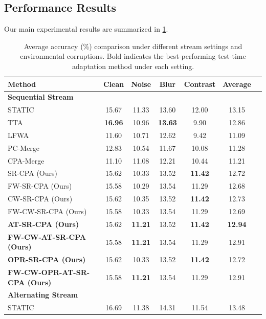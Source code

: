 \documentclass{article}
\theoremstyle{plain}
\theoremstyle{definition}
\theoremstyle{remark}
\begin{document}
\subsection{Performance Results}
\label{subsec:results}

Our main experimental results are summarized in \cref{tab:results}.

\begin{table}[t]
\caption{Average accuracy (\%) comparison under different stream settings and environmental corruptions. Bold indicates the best-performing test-time adaptation method under each setting.}
\label{tab:results}
\begin{center}
\begin{small}
\begin{sc}
\begin{tabular}{lccccc|c}
\toprule
Method & Clean & Noise & Blur & Contrast & Average \\
\midrule
\textbf{Sequential Stream} & & & & & \\
STATIC & 15.67 & 11.33 & 13.60 & 12.00 & 13.15 \\
TTA & \textbf{16.96} & 10.96 & \textbf{13.63} & 9.90 & 12.86 \\
LFWA & 11.60 & 10.71 & 12.62 & 9.42 & 11.09 \\
PC-Merge & 12.83 & 10.54 & 11.67 & 10.08 & 11.28 \\
CPA-Merge & 11.10 & 11.08 & 12.21 & 10.44 & 11.21 \\
SR-CPA (Ours) & 15.62 & 10.33 & 13.52 & \textbf{11.42} & 12.72 \\
FW-SR-CPA (Ours) & 15.58 & 10.29 & 13.54 & 11.29 & 12.68 \\
CW-SR-CPA (Ours) & 15.62 & 10.35 & 13.52 & \textbf{11.42} & 12.73 \\
FW-CW-SR-CPA (Ours) & 15.58 & 10.33 & 13.54 & 11.29 & 12.69 \\
\textbf{AT-SR-CPA (Ours)} & 15.62 & \textbf{11.21} & 13.52 & \textbf{11.42} & \textbf{12.94} \\
\textbf{FW-CW-AT-SR-CPA (Ours)} & 15.58 & \textbf{11.21} & 13.54 & 11.29 & 12.91 \\
\textbf{OPR-SR-CPA (Ours)} & 15.62 & 10.33 & 13.52 & \textbf{11.42} & 12.72 \\
\textbf{FW-CW-OPR-AT-SR-CPA (Ours)} & 15.58 & \textbf{11.21} & 13.54 & 11.29 & 12.91 \\
\midrule
\textbf{Alternating Stream} & & & & & \\
STATIC & 16.69 & 11.38 & 14.31 & 11.54 & 13.48 \\

\end{tabular}
\end{sc}
\end{small}
\end{center}
\end{table}
\end{document}
